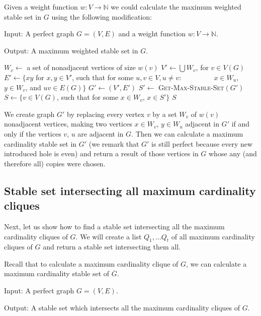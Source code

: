Given a weight function $w : V \rightarrow \mathbb{N}$ we could calculate the maximum weighted stable set in $G$ using the following modification:

\begin{alg}
  \label{alg:maxWeightedStableSet}
  Input: A perfect graph $G = (V, E)$ and a weight function $w : V \rightarrow \mathbb{N}$.

  \noindent Output: A maximum weighted stable set in $G$.
\end{alg}

\begin{algorithmic}[1]
  \ls $W_v \gets$ a set of nonadjacent vertices of size $w(v)$
  \mEndFor
  \ls $V' \gets \bigcup W_v$, for $v \in V(G)$ 
  \ls $E' \gets \{xy$ for $x, y \in V'$, such that for some $u, v \in V, u \neq v$:
  \lsx~~~~~~~~ $x \in W_u$, $y \in W_v$, and $uv \in E(G)\}$
  \ls $G' \gets (V', E')$
  \ls $S' \gets$ \textsc{Get-Max-Stable-Set$(G')$}
  \ls $S \gets \{v \in V(G)$, such that for some $x\in W_v$, $x \in S'\}$
  \ls \RETURN $S$
  \mEndProcedure
\end{algorithmic}

We create graph $G'$ by replacing every vertex $v$ by a set $W_v$ of $w(v)$ nonadjacent vertices, making two vertices $x \in W_v$, $y \in W_u$ adjacent in $G'$ if and only if the vertices $v$, $u$ are adjacent in $G$. Then we can calculate a maximum cardinality stable set in $G'$ (we remark that $G'$ is still perfect because every new introduced hole is even) and return a result of those vertices in $G$ whose any (and therefore all) copies were chosen.

\subsection{Stable set intersecting all maximum cardinality cliques}
Next, let us show how to find a stable set intersecting all the maximum cardinality cliques of $G$. We will create a list $Q_1, \ldots Q_t$ of all maximum cardinality cliques of $G$ and return a stable set intersecting them all.

Recall that to calculate a maximum cardinality clique of $G$, we can calculate a maximum cardinality stable set of $\overline{G}$.
\begin{alg}
  \label{alg:ssIntersectingCliques}
  Input: A perfect graph $G = (V, E)$.

  \noindent Output: A stable set which intersects all the maximum cardinality cliques of $G$.
\end{alg}

